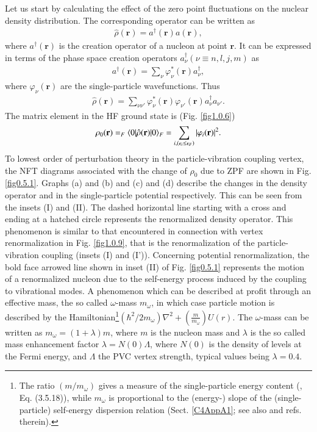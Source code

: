  Let us start by calculating the effect of the zero point fluctuations on the nuclear density distribution. The corresponding operator can be written as
\begin{align}\label{eq0.1.123}
\hat\rho(\mathbf r)=a^\dagger(\mathbf r)a(\mathbf r),
\end{align}
where $a^\dagger(\mathbf r)$ is the creation operator of a nucleon at point $\mathbf r$. It can be expressed in terms of the phase space creation operators $a^\dagger_\nu(\nu\equiv n,l,j,m)$ as
\begin{align}\label{eq0.1.124}
a^\dagger(\mathbf r)=\sum_\nu\varphi^*_\nu(\mathbf r) a^\dagger_\nu,
\end{align}
where $\varphi_\nu(\mathbf r)$ are the single-particle wavefunctions. Thus
\begin{align}\label{eq0.1.125}
\hat\rho(\mathbf r)=\sum_{\nu\nu'}\varphi^*_\nu(\mathbf r)\varphi_{\nu'}(\mathbf r)a^\dagger_\nu a_{\nu'}.
\end{align}
The matrix element in the HF ground state is (Fig. \ref{fig1.0.6})
\begin{align}\label{eq0.1.126}
\rho_0(\mathbf r)=_F\langle {0|\hat\rho(\mathbf r)|0} \rangle_F=\sum_{i, (\epsilon_i\leq\epsilon_F)}|\varphi_i(\mathbf r)|^2.
\end{align}
To lowest order of perturbation theory in the particle-vibration coupling vertex, the NFT diagrams associated with the change of $\rho_0$ due to ZPF are shown in Fig. \ref{fig0.5.1}. Graphs (a) and (b) and (c) and (d) describe the changes in the density operator and in the single-particle potential respectively. This can be seen from the insets (I) and (II). The dashed horizontal line starting with a cross and ending at a hatched circle represents the renormalized density operator. This phenomenon is similar to that encountered in connection with vertex renormalization in Fig. \ref{fig1.0.9}, that is the renormalization of the particle-vibration coupling (insets (I) and (I')). Concerning potential renormalization, the bold face arrowed line shown in inset (II) of Fig. \ref{fig0.5.1} represents the motion of a renormalized nucleon due to the self-energy process induced by the coupling to vibrational modes. A phenomenon which can be described at profit through an effective mass, the so called $\omega$-mass $m_\omega$, in which case particle motion is described by the Hamiltonian\footnote{The ratio $(m/m_\omega)$ gives a measure of the single-particle energy content (\cite{Mahaux:85}, Eq. (3.5.18)), while $m_\omega$ is proportional to the (energy-) slope of the (single-particle) self-energy dispersion relation (Sect. \ref{C4AppA1}; see also  \cite{Brink:05} and refs. therein).}$\left(\hbar^2/2m_\omega\right)\nabla^2+\left(\frac{m}{m_\omega}\right)U(r)$. The $\omega$-mass can be written as $m_\omega=(1+\lambda)m$, where $m$ is the nucleon mass and $\lambda$ is the so called mass enhancement factor $\lambda=N(0)\Lambda$, where $N(0)$ is the density of levels at the Fermi energy, and $\Lambda$ the PVC vertex strength, typical values being $\lambda=0.4$.

